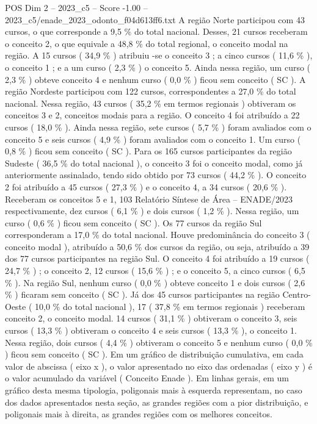 \begin{textsample}{POS Dim 2 – 2023\_c5 – Score -1.00 – 2023\_c5/enade\_2023\_odonto\_f04d613ff6.txt}
A região Norte participou com 43 cursos, o que corresponde a 9,5 \% do total nacional.
Desses, 21 cursos receberam o conceito 2, o que equivale a 48,8 \% do total regional, o conceito modal na região.
A 15 cursos ( 34,9 \% ) atribuiu -se o conceito 3 ; a cinco cursos ( 11,6 \% ), o conceito 1 ; e a um curso ( 2,3 \% ) o conceito 5.
Ainda nessa região, um curso ( 2,3 \% ) obteve conceito 4 e nenhum curso ( 0,0 \% ) ficou sem conceito ( SC ).
A região Nordeste participou com 122 cursos, correspondentes a 27,0 \% do total nacional.
Nessa região, 43 cursos ( 35,2 \% em termos regionais ) obtiveram os conceitos 3 e 2, conceitos modais para a região.
O conceito 4 foi atribuído a 22 cursos ( 18,0 \% ).
Ainda nessa região, sete cursos ( 5,7 \% ) foram avaliados com o conceito 5 e seis cursos ( 4,9 \% ) foram avaliados com o conceito 1.
Um curso ( 0,8 \% ) ficou sem conceito ( SC ).
Para os 165 cursos participantes da região Sudeste ( 36,5 \% do total nacional ), o conceito 3 foi o conceito modal, como já anteriormente assinalado, tendo sido obtido por 73 cursos ( 44,2 \% ).
O conceito 2 foi atribuído a 45 cursos ( 27,3 \% ) e o conceito 4, a 34 cursos ( 20,6 \% ).
Receberam os conceitos 5 e 1, 103 Relatório Síntese de Área – ENADE/2023 respectivamente, dez cursos ( 6,1 \% ) e dois cursos ( 1,2 \% ).
Nessa região, um curso ( 0,6 \% ) ficou sem conceito ( SC ).
Os 77 cursos da região Sul corresponderam a 17,0 \% do total nacional.
Houve predominância do conceito 3 ( conceito modal ), atribuído a 50,6 \% dos cursos da região, ou seja, atribuído a 39 dos 77 cursos participantes na região Sul.
O conceito 4 foi atribuído a 19 cursos ( 24,7 \% ) ; o conceito 2, 12 cursos ( 15,6 \% ) ; e o conceito 5, a cinco cursos ( 6,5 \% ).
Na região Sul, nenhum curso ( 0,0 \% ) obteve conceito 1 e dois cursos ( 2,6 \% ) ficaram sem conceito ( SC ).
Já dos 45 cursos participantes na região Centro-Oeste ( 10,0 \% do total nacional ), 17 ( 37,8 \% em termos regionais ) receberam conceito 2, o conceito modal. 14 cursos ( 31,1 \% ) obtiveram o conceito 3, seis cursos ( 13,3 \% ) obtiveram o conceito 4 e seis cursos ( 13,3 \% ), o conceito 1.
Nessa região, dois cursos ( 4,4 \% ) obtiveram o conceito 5 e nenhum curso ( 0,0 \% ) ficou sem conceito ( SC ).
Em um gráfico de distribuição cumulativa, em cada valor de abscissa ( eixo x ), o valor apresentado no eixo das ordenadas ( eixo y ) é o valor acumulado da variável ( Conceito Enade ).
Em linhas gerais, em um gráfico desta mesma tipologia, poligonais mais à esquerda representam, no caso dos dados apresentados nesta seção, as grandes regiões com a pior distribuição, e poligonais mais à direita, as grandes regiões com os melhores conceitos.

\end{textsample}
